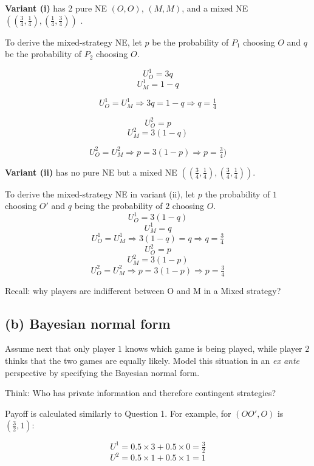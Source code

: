 \documentclass{article}
\begin{document}
\textbf{Variant (i)} has 2 pure NE $(O,O)$, $(M,M)$,  and a mixed NE $\left( \left( \tfrac34, \tfrac14 \right), \left( \tfrac14, \tfrac34 \right) \right)$ .

\medskip

To derive the mixed-strategy NE, let $p$ be the probability of $P_1$ choosing $O$ and $q$ be the probability of $P_2$ choosing $O$. 

$$U^1_O=3q$$ 
$$U^1_M=1-q$$

$$U^1_O = U^1_M \Rightarrow 3q = 1-q \Rightarrow q = \tfrac14$$

$$U^2_O=p$$ 
$$U^2_M=3(1-q)$$

$$U^2_O = U^2_M \Rightarrow p = 3(1-p) \Rightarrow p = \tfrac34)$$

\bigskip

\textbf{Variant (ii)}  has no pure NE but a mixed NE $\left( \left( \tfrac34, \tfrac14 \right), \left( \tfrac34, \tfrac14 \right) \right)$.

\medskip

To derive the mixed-strategy NE in variant (ii), let $p$ the probability of $1$ choosing $O'$ and $q$ being the probability of $2$ choosing $O$. 
$$U^1_O=3(1-q)$$ 
$$U^1_M=q$$
$$U^1_O = U^1_M \Rightarrow 3(1-q) = q \Rightarrow q = \tfrac34$$
$$U^2_O=p$$ 
$$U^2_M=3(1-p)$$
$$U^2_O = U^2_M \Rightarrow p = 3(1-p) \Rightarrow p = \tfrac34$$
\begin{mdframed}[backgroundcolor=blue!20,linecolor=white]
Recall: why players are indifferent between O and M in a Mixed strategy?
\end{mdframed}



\subsection*{(b) Bayesian normal form}

Assume next that only player $1$ knows which game is being played, while player $2$ thinks that
the two games are equally likely. Model this situation in an \textit{ex ante} perspective by specifying
the Bayesian normal form.

\smallskip

\begin{mdframed}[backgroundcolor=blue!20,linecolor=white]
Think: Who has private information and therefore contingent strategies?

\medskip

Payoff is calculated similarly to Question 1. For example, for $(OO',O)$ is $(\tfrac32,1)$:

$$U^1 = 0.5 \times 3 + 0.5 \times 0 = \tfrac32$$
$$U^2 = 0.5 \times 1 + 0.5 \times 1 = 1$$
\end{mdframed}
\end{document}

